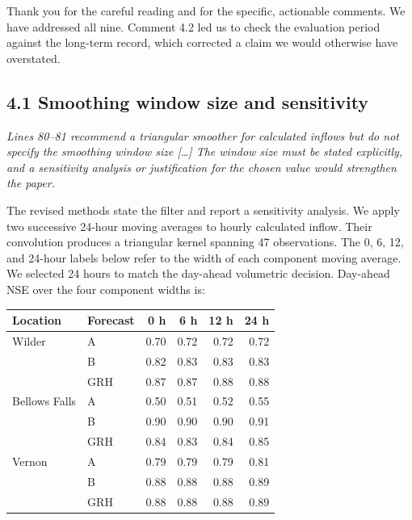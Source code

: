 \documentclass[11pt]{article}
\newenvironment{rc}%
  {\begin{list}{}{\setlength{\leftmargin}{1.5em}\setlength{\rightmargin}{1.5em}%
   \setlength{\topsep}{0.2em}\setlength{\parsep}{0pt}\setlength{\itemsep}{0pt}}%
   \item[]\itshape\color{quotegray}}%
  {\end{list}}
\begin{document}
Thank you for the careful reading and for the specific, actionable comments. We have addressed all
nine. Comment 4.2 led us to check the evaluation period against the long-term record, which
corrected a claim we would otherwise have overstated.

\subsection*{4.1 Smoothing window size and sensitivity}

\begin{rc}
Lines 80--81 recommend a triangular smoother for calculated inflows but do not specify the
smoothing window size [\ldots] The window size must be stated explicitly, and a sensitivity
analysis or justification for the chosen value would strengthen the paper.
\end{rc}

The revised methods state the filter and report a sensitivity analysis. We apply two successive
24-hour moving averages to hourly calculated inflow. Their convolution produces a triangular
kernel spanning 47 observations. The 0, 6, 12, and 24-hour labels below refer to the width of
each component moving average. We selected 24 hours to match the day-ahead volumetric decision.
Day-ahead NSE over the four component widths is:

\begin{center}
\begin{tabular}{llrrrr}
\toprule
Location & Forecast & 0 h & 6 h & 12 h & 24 h \\
\midrule
Wilder        & A   & 0.70 & 0.72 & 0.72 & 0.72 \\
              & B   & 0.82 & 0.83 & 0.83 & 0.83 \\
              & GRH & 0.87 & 0.87 & 0.88 & 0.88 \\
Bellows Falls & A   & 0.50 & 0.51 & 0.52 & 0.55 \\
              & B   & 0.90 & 0.90 & 0.90 & 0.91 \\
              & GRH & 0.84 & 0.83 & 0.84 & 0.85 \\
Vernon        & A   & 0.79 & 0.79 & 0.79 & 0.81 \\
              & B   & 0.88 & 0.88 & 0.88 & 0.89 \\
              & GRH & 0.88 & 0.88 & 0.88 & 0.89 \\
\bottomrule
\end{tabular}
\end{center}
\end{document}
